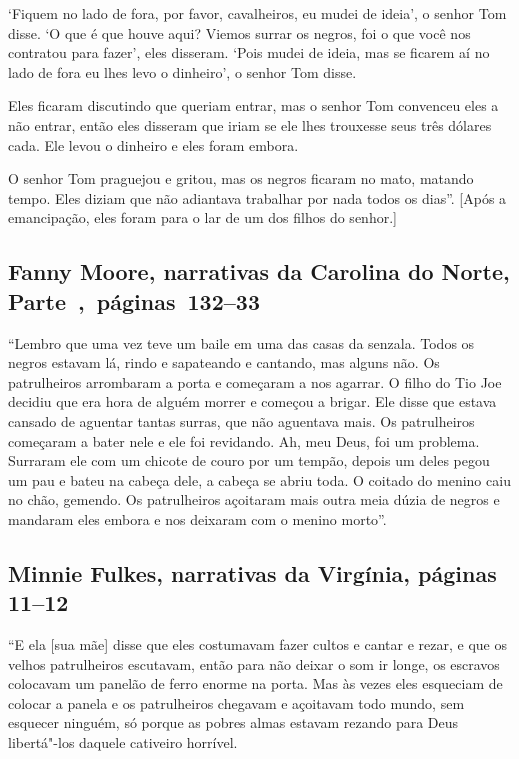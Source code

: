 `Fiquem no lado de fora, por favor, cavalheiros, eu mudei de ideia', o
senhor Tom disse. `O que é que houve aqui? Viemos surrar os negros, foi
o que você nos contratou para fazer', eles disseram. `Pois mudei de
ideia, mas se ficarem aí no lado de fora eu lhes levo o dinheiro', o
senhor Tom disse.

Eles ficaram discutindo que queriam entrar, mas o senhor Tom convenceu
eles a não entrar, então eles disseram que iriam se ele lhes trouxesse
seus três dólares cada. Ele levou o dinheiro e eles foram embora.

O senhor Tom praguejou e gritou, mas os negros ficaram no mato, matando
tempo. Eles diziam que não adiantava trabalhar por nada todos os dias''.
{[}Após a emancipação, eles foram para o lar de um dos filhos do
senhor.{]}

\subsection{Fanny Moore, narrativas da Carolina do Norte, Parte~,~páginas~132--33}
\label{ref195}

``Lembro que uma vez teve um baile em uma das casas da senzala. Todos os
negros estavam lá, rindo e sapateando e cantando, mas alguns não. Os
patrulheiros arrombaram a porta e começaram a nos agarrar. O filho do
Tio Joe decidiu que era hora de alguém morrer e começou a brigar. Ele
disse que estava cansado de aguentar tantas surras, que não aguentava
mais. Os patrulheiros começaram a bater nele e ele foi revidando. Ah,
meu Deus, foi um problema. Surraram ele com um chicote de couro por um
tempão, depois um deles pegou um pau e bateu na cabeça dele, a cabeça se
abriu toda. O coitado do menino caiu no chão, gemendo. Os patrulheiros
açoitaram mais outra meia dúzia de negros e mandaram eles embora e nos
deixaram com o menino morto''.

\subsection{Minnie Fulkes, narrativas da Virgínia, páginas 11--12} \label{ref96}

``E ela {[}sua mãe{]} disse que eles costumavam fazer cultos e cantar e
rezar, e que os velhos patrulheiros escutavam, então para não deixar o
som ir longe, os escravos colocavam um panelão de ferro enorme na porta.
Mas às vezes eles esqueciam de colocar a panela e os patrulheiros
chegavam e açoitavam todo mundo, sem esquecer ninguém, só porque as
pobres almas estavam rezando para Deus libertá"-los daquele cativeiro
horrível.

